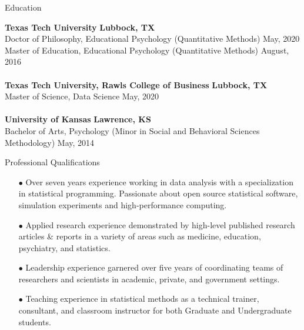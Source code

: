 \documentclass{resume} %
\begin{document}

\begin{rSection}{Education}

{\bf Texas Tech University} \hfill {\bf Lubbock, TX}
\\ Doctor of Philosophy, Educational Psychology (Quantitative Methods)
\hfill May, 2020 \\ 
Master of Education, Educational Psychology (Quantitative Methods)
\hfill August, 2016
\\
\\{\bf Texas Tech University, Rawls College of Business} \hfill {\bf
  Lubbock, TX}
\\ Master of Science, Data Science \hfill May, 2020
\\
\\{\bf University of Kansas} \hfill {\bf Lawrence, KS}
\\Bachelor of Arts, Psychology (Minor in Social and Behavioral
Sciences Methodology) \hfill May, 2014

\end{rSection}

\begin{rSection}{Professional Qualifications}
  \begin{enumerate}
  \item[$\bullet$] Over seven years experience working in data
    analysis with a specialization in statistical
    programming. Passionate about open source statistical software, simulation experiments and
    high-performance computing.
  \item[$\bullet$] Applied research experience demonstrated by high-level published research articles \& reports in a
    variety of areas such as medicine, education, psychiatry, and statistics.
  \item[$\bullet$] Leadership experience garnered over five years of
    coordinating teams of researchers and scientists in academic,
    private, and government settings.
  \item[$\bullet$] Teaching experience in statistical methods as a
    technical trainer, consultant, and classroom instructor for
    both Graduate and Undergraduate students.
  \end{enumerate}
\end{rSection}

\end{document}
